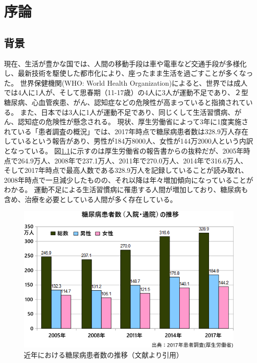 \chapter{序論}
\label{chap:introduction}

\section{背景}
\label{section:background}
現在、生活が豊かな国では、人間の移動手段は車や電車など交通手段が多様化し、最新技術を駆使した都市化により、座ったまま生活を過ごすことが多くなった。
世界保健機関(WHO: World Health Organization)によると、世界では成人では4人に1人が、そして思春期（11-17歳）の4人に3人が運動不足であり、２型糖尿病、心血管疾患、がん、認知症などの危険性が高まっていると指摘されている。\cite{}
また、日本では3人に1人が運動不足であり、同じくして生活習慣病、がん、認知症の危険性が懸念される。\cite{obesity_report}
現状、厚生労働省によって3年に1度実施されている「患者調査の概況」では、2017年時点で糖尿病患者数は328.9万人存在しているという報告があり、男性が184万8000人、女性が144万2000人という内訳となっている。\cite{diabetes_statistics}
図\ref{fig:diabetes_total_number}に示すのは厚生労働省の報告書からの抜粋だが、2005年時点で264.9万人、2008年で237.1万人、2011年で270.0万人、2014年で316.6万人、そして2017年時点で最高人数である328.9万人を記録していることが読み取れ、2008年時点で一旦減少したものの、それ以降は年々増加傾向になっていることがわかる。
運動不足による生活習慣病に罹患する人間が増加しており、糖尿病も含め、治療を必要としている人間が多く存在している。

\begin{figure}[htbp]
  \caption{近年における糖尿病患者数の推移（文献\cite{diabetes_statistics}より引用）}
  \label{fig:diabetes_total_number}
  \begin{center}
    \includegraphics[bb=0 0 600 400,width=15cm]{assets/diabetes_total_number.png}
  \end{center}
\end{figure}


